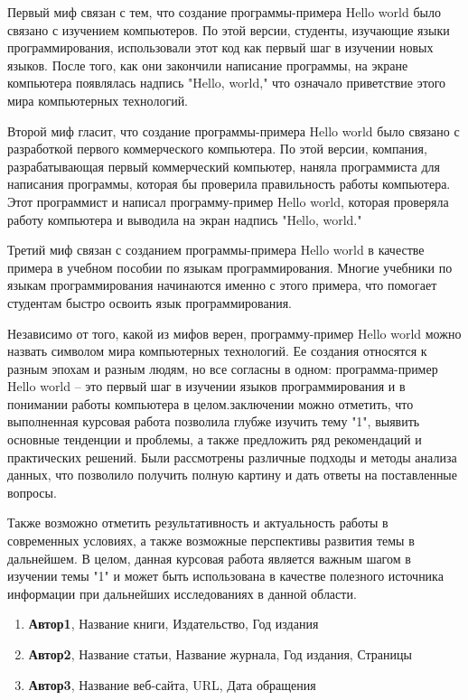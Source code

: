 \documentclass[draft]{article}
\begin{document}
Первый миф связан с тем, что создание программы-примера Hello world было связано с изучением компьютеров. По этой версии, студенты, изучающие языки программирования, использовали этот код как первый шаг в изучении новых языков. После того, как они закончили написание программы, на экране компьютера появлялась надпись "Hello, world," что означало приветствие этого мира компьютерных технологий.

Второй миф гласит, что создание программы-примера Hello world было связано с разработкой первого коммерческого компьютера. По этой версии, компания, разрабатывающая первый коммерческий компьютер, наняла программиста для написания программы, которая бы проверила правильность работы компьютера. Этот программист и написал программу-пример Hello world, которая проверяла работу компьютера и выводила на экран надпись "Hello, world."

Третий миф связан с созданием программы-примера Hello world в качестве примера в учебном пособии по языкам программирования. Многие учебники по языкам программирования начинаются именно с этого примера, что помогает студентам быстро освоить язык программирования.

Независимо от того, какой из мифов верен, программу-пример Hello world можно назвать символом мира компьютерных технологий. Ее создания относятся к разным эпохам и разным людям, но все согласны в одном: программа-пример Hello world – это первый шаг в изучении языков программирования и в понимании работы компьютера в целом. заключении можно отметить, что выполненная курсовая работа позволила глубже изучить тему "1", выявить основные тенденции и проблемы, а также предложить ряд рекомендаций и практических решений. Были рассмотрены различные подходы и методы анализа данных, что позволило получить полную картину и дать ответы на поставленные вопросы.

Также возможно отметить результативность и актуальность работы в современных условиях, а также возможные перспективы развития темы в дальнейшем. В целом, данная курсовая работа является важным шагом в изучении темы "1" и может быть использована в качестве полезного источника информации при дальнейших исследованиях в данной области.\newpage\Sources

\begin{enumerate}

\item \textbf{Автор1}, Название книги, Издательство, Год издания

\item \textbf{Автор2}, Название статьи, Название журнала, Год издания, Страницы

\item \textbf{Автор3}, Название веб-сайта, URL, Дата обращения

\end{enumerate}
\end{document}
